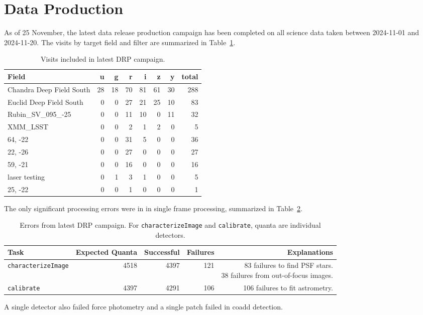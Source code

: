 \section{Data Production}
\label{sec:data_production}

As of 25 November, the latest data release production campaign has been completed on all science
data taken between 2024-11-01 and 2024-11-20. The visits by target field and filter are summarized
in Table~\ref{table:data_production_visits}.

\begin{table}
\begin{tabular}{lrrrrrrr}
Field & u & g & r & i & z & y & total \\
\hline
Chandra Deep Field South & 28 & 18 & 70 & 81 & 61 & 30 & 288 \\
Euclid Deep Field South & 0 & 0 & 27 & 21 & 25 & 10 & 83 \\
Rubin\_SV\_095\_-25 & 0 & 0 & 11 & 10 & 0 & 11 & 32 \\
XMM\_LSST & 0 & 0 & 2 & 1 & 2 & 0 & 5 \\
64, -22 & 0 & 0 & 31 & 5 & 0 & 0 & 36 \\
22, -26 & 0 & 0 & 27 & 0 & 0 & 0 & 27 \\
59, -21 & 0 & 0 & 16 & 0 & 0 & 0 & 16 \\
laser testing & 0 & 1 & 3 & 1 & 0 & 0 & 5 \\
25, -22 & 0 & 0 & 1 & 0 & 0 & 0 & 1 \\
\end{tabular}
\caption{Visits included in latest DRP campaign.}
\label{table:data_production_visits}
\end{table}

The only significant processing errors were in in single frame processing, summarized in
Table~\ref{table:data_production_errors}.

\begin{table}
\begin{tabular}{lrrrr}
Task & Expected Quanta & Successful & Failures & Explanations \\
\hline
\texttt{characterizeImage} & 4518 & 4397 & 121 & \makecell{83 failures to find PSF stars.\\ 38 failures from out-of-focus
    images.} \\
\texttt{calibrate} & 4397 & 4291 & 106 & 106 failures to fit astrometry.\\
\end{tabular}
\caption{Errors from latest DRP campaign. For \texttt{characterizeImage} and \texttt{calibrate},
    quanta are individual detectors.}
\label{table:data_production_errors}
\end{table}

A single detector also failed force photometry and a single patch failed in coadd detection.


